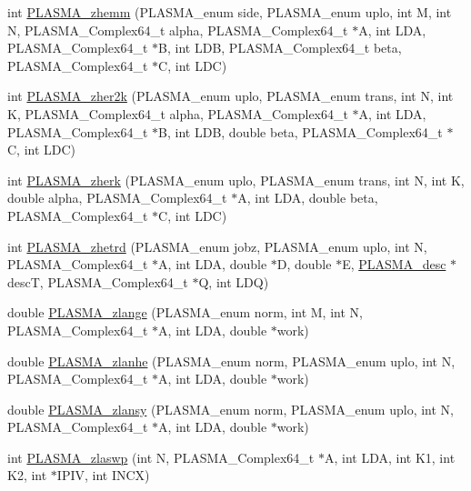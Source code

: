 \begin{DoxyCompactItemize}
\item 
int \hyperlink{group__PLASMA__Complex64__t_gad53a9ae69e0ff46c3859f19c16b97081_gad53a9ae69e0ff46c3859f19c16b97081}{PLASMA\_\-zhemm} (PLASMA\_\-enum side, PLASMA\_\-enum uplo, int M, int N, PLASMA\_\-Complex64\_\-t alpha, PLASMA\_\-Complex64\_\-t $\ast$A, int LDA, PLASMA\_\-Complex64\_\-t $\ast$B, int LDB, PLASMA\_\-Complex64\_\-t beta, PLASMA\_\-Complex64\_\-t $\ast$C, int LDC)
\item 
int \hyperlink{group__PLASMA__Complex64__t_ga1086284f7bd6db0de2341eeaa3a3e655_ga1086284f7bd6db0de2341eeaa3a3e655}{PLASMA\_\-zher2k} (PLASMA\_\-enum uplo, PLASMA\_\-enum trans, int N, int K, PLASMA\_\-Complex64\_\-t alpha, PLASMA\_\-Complex64\_\-t $\ast$A, int LDA, PLASMA\_\-Complex64\_\-t $\ast$B, int LDB, double beta, PLASMA\_\-Complex64\_\-t $\ast$C, int LDC)
\item 
int \hyperlink{group__PLASMA__Complex64__t_ga37897923ff4fb613bbd5a69a58b12fb8_ga37897923ff4fb613bbd5a69a58b12fb8}{PLASMA\_\-zherk} (PLASMA\_\-enum uplo, PLASMA\_\-enum trans, int N, int K, double alpha, PLASMA\_\-Complex64\_\-t $\ast$A, int LDA, double beta, PLASMA\_\-Complex64\_\-t $\ast$C, int LDC)
\item 
int \hyperlink{group__PLASMA__Complex64__t_gadeaa16b417f2033a10685c130db081fb_gadeaa16b417f2033a10685c130db081fb}{PLASMA\_\-zhetrd} (PLASMA\_\-enum jobz, PLASMA\_\-enum uplo, int N, PLASMA\_\-Complex64\_\-t $\ast$A, int LDA, double $\ast$D, double $\ast$E, \hyperlink{typeplasma__desc__t}{PLASMA\_\-desc} $\ast$descT, PLASMA\_\-Complex64\_\-t $\ast$Q, int LDQ)
\item 
double \hyperlink{group__PLASMA__Complex64__t_ga89327462733d7b77d403e9612954474d_ga89327462733d7b77d403e9612954474d}{PLASMA\_\-zlange} (PLASMA\_\-enum norm, int M, int N, PLASMA\_\-Complex64\_\-t $\ast$A, int LDA, double $\ast$work)
\item 
double \hyperlink{group__PLASMA__Complex64__t_ga3667b32ec418aa44fe1e28b78a670af6_ga3667b32ec418aa44fe1e28b78a670af6}{PLASMA\_\-zlanhe} (PLASMA\_\-enum norm, PLASMA\_\-enum uplo, int N, PLASMA\_\-Complex64\_\-t $\ast$A, int LDA, double $\ast$work)
\item 
double \hyperlink{group__PLASMA__Complex64__t_ga56ed091feed59f955ba15b8c6204e06a_ga56ed091feed59f955ba15b8c6204e06a}{PLASMA\_\-zlansy} (PLASMA\_\-enum norm, PLASMA\_\-enum uplo, int N, PLASMA\_\-Complex64\_\-t $\ast$A, int LDA, double $\ast$work)
\item 
int \hyperlink{group__PLASMA__Complex64__t_ga33f553c60d1f95a0d7da9e7e17e2a160_ga33f553c60d1f95a0d7da9e7e17e2a160}{PLASMA\_\-zlaswp} (int N, PLASMA\_\-Complex64\_\-t $\ast$A, int LDA, int K1, int K2, int $\ast$IPIV, int INCX)

\end{DoxyCompactItemize}
